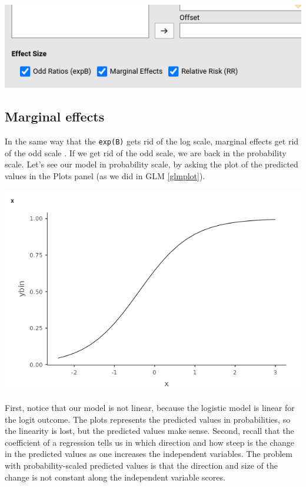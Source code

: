 \documentclass[
]{book}
\begin{document}
\includegraphics[width=7.28in]{bookletpics/3_logistic_input3}

\hypertarget{logisticcontmarginal}{%
\subsection{Marginal effects}\label{logisticcontmarginal}}

In the same way that the \texttt{exp(B)} gets rid of the log scale, marginal effects get rid of the odd scale \citep{agresti2018simple}. If we get rid of the odd scale, we are back in the probability scale. Let's see our model in probability scale, by asking the plot of the predicted values in the {Plots} panel (as we did in GLM \ref{glmplot}).

\includegraphics[width=8.75in]{bookletpics/3_logistic_plot2}

First, notice that our model is not linear, because the logistic model is linear for the logit outcome. The plots represents the predicted values in probabilities, so the linearity is lost, but the predicted values make sense. Second, recall that the coefficient of a regression tells us in which direction and how steep is the change in the predicted values as one increases the independent variables. The problem with probability-scaled predicted values is that the direction and size of the change is not constant along the independent variable scores.
\end{document}
